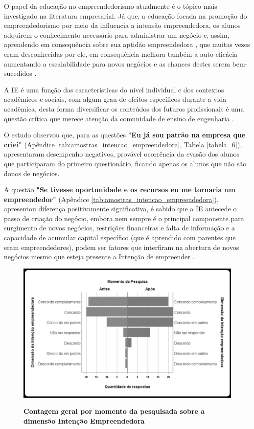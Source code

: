 O papel da educação no empreendedorismo atualmente é o tópico mais  investigado na literatura empresarial. Já que, a educação focada na promoção do empreendedorismo por meio da influencia a intensão empreendedora, os alunos adquirem o conhecimento necessário para administrar um negócio e, assim, aprendendo em consequência sobre sua aptidão empreendedora \cite{nowinski_impact_2019}, que muitas vezes eram desconhecidas por ele, em consequência melhora também a auto-eficácia \cite{egerova_does_2017} aumentando a escalabilidade para novos negócios e as chances destes serem bem-sucedidos \cite{kolstad_education_2015}.

A IE é uma função das características do nível individual e dos contextos acadêmicos e sociais, com algum grau de efeitos específicos durante a vida acadêmica, desta forma diversificar os conteúdos dos futuros profissionais é uma questão crítica que merece atenção da comunidade de ensino de engenharia \cite{gilmartin_entrepreneurial_2019}.

O estudo observou que, para as questões \textbf{"Eu já sou patrão na empresa que criei"} (Apêndice \ref{tab:amostras_intencao_empreendedora}, Tabela \ref{tabela_6}), apresentaram desempenho negativos, provável ocorrência da evasão dos alunos que participaram do primeiro questionário, ficando apenas os alunos que não são donos de negócios. 


A questão \textbf{"Se tivesse oportunidade e os recursos eu me tornaria um empreendedor"} (Apêndice \ref{tab:amostras_intencao_empreendedora}), apresentou diferença positivamente significativa, é sabido que a IE antecede o passo de criação do negócio, embora nem sempre é o principal componente para surgimento de novos negócios, restrições financeiras e falta de informação e a capacidade de acumular capital específico (que é aprendido com parentes que eram empreendedores), podem ser fatores que interfiram na abertura de novos negócios mesmo que esteja presente a Intenção de empreender \cite{auguste_what_2016}.



\begin{figure}[H]
\centering
\caption{\textbf{Contagem geral por momento da pesquisada sobre a dimensão Intenção Empreendedora}}
\includegraphics[scale=0.4]{Imagens/intencao_empreendedora.png}
\label{figura_45}
\end{figure}





